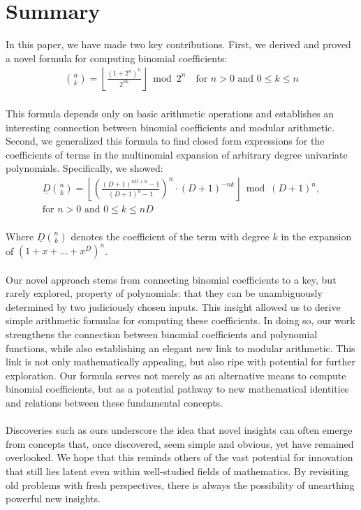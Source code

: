 \documentclass{article}
\theoremstyle{plain}
\begin{document}
\section{Summary}
In this paper, we have made two key contributions. First, we derived and proved a novel formula for computing binomial coefficients:
\begin{align*}
\binom{n}{k} = \left\lfloor\frac{(1 + 2^{n})^{n}}{2^{n k}}\right\rfloor \bmod{2^{n}} \quad \text{for } n > 0 \text{ and } 0 \leq k \leq n
\end{align*}
\\
This formula depends only on basic arithmetic operations and establishes an interesting connection between binomial coefficients and modular arithmetic. 
\\
Second, we generalized this formula to find closed form expressions for the coefficients of terms in the multinomial expansion of arbitrary degree univariate polynomials. Specifically, we showed:
\begin{align*}
\underline{D}\binom{n}{k} = \left\lfloor \left(\frac{(D+1)^{nD+n} - 1}{(D+1)^{n} - 1}\right)^n \cdot (D + 1)^{-n k}\right\rfloor \bmod (D + 1)^n, \\ \text{for } n > 0 \text{ and } 0 \leq k \leq nD
\end{align*}
\\
Where \(\underline{D}\binom{n}{k}\) denotes the coefficient of the term with degree \(k\) in the expansion of \((1+x+\ldots+x^D)^n\).
\\
\\
Our novel approach stems from connecting binomial coefficients to a key, but rarely explored, property of polynomials: that they can be unambiguously determined by two judiciously chosen inputs. This insight allowed us to derive simple arithmetic formulas for computing these coefficients. In doing so, our work strengthens the connection between binomial coefficients and polynomial functions, while also establishing an elegant new link to modular arithmetic. This link is not only mathematically appealing, but also ripe with potential for further exploration. Our formula serves not merely as an alternative means to compute binomial coefficients, but as a potential pathway to new mathematical identities and relations between these fundamental concepts.
\\
\\
Discoveries such as ours underscore the idea that novel insights can often emerge from concepts that, once discovered, seem simple and obvious, yet have remained overlooked. We hope that this reminds others of the vast potential for innovation that still lies latent even within well-studied fields of mathematics. By revisiting old problems with fresh perspectives, there is always the possibility of unearthing powerful new insights.
\end{document}
